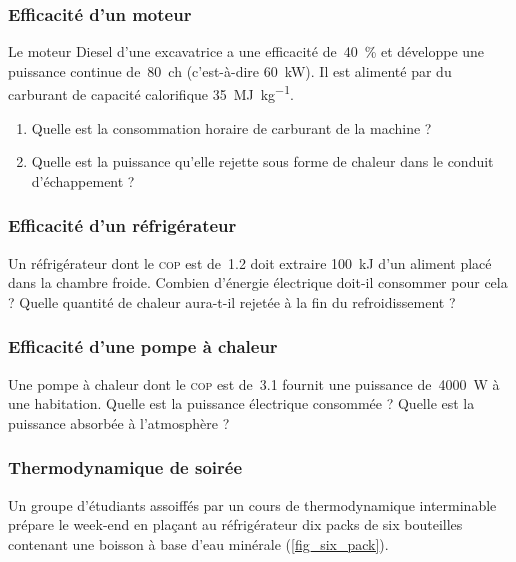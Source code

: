 \begin{boiboiboite}
	\propeau
	\propair
	\isentropiques
\end{boiboiboite}


\subsubsection{Efficacité d’un moteur}
\label{exo_efficacite_moteur}

	Le moteur Diesel d’une excavatrice a une efficacité de~\SI{40}{\percent} et développe une puissance continue de~\SI{80}{ch} (c’est-à-dire \SI{60}{\kilo\watt}). Il est alimenté par du carburant de capacité calorifique \SI{35}{\mega\joule\per\kilogram}.
	
	\begin{enumerate}
		\item Quelle est la consommation horaire de carburant de la machine ?
		\item Quelle est la puissance qu’elle rejette sous forme de chaleur dans le conduit d’échappement ?
	\end{enumerate}

\subsubsection{Efficacité d’un réfrigérateur}
\label{exo_efficacite_refrigerateur}

	Un réfrigérateur dont le \textsc{cop} est de~\num{1,2} doit extraire \SI{100}{\kilo\joule} d’un aliment placé dans la chambre froide. Combien d’énergie électrique doit-il consommer pour cela ? Quelle quantité de chaleur aura-t-il rejetée à la fin du refroidissement ?
	

\subsubsection{Efficacité d’une pompe à chaleur}
\label{exo_efficacite_thermopompe}

	Une pompe à chaleur dont le \textsc{cop} est de~\num{3,1} fournit une puissance de~\SI{4000}{\watt} à une habitation. Quelle est la puissance électrique consommée ? Quelle est la puissance absorbée à l’atmosphère ?


\subsubsection{Thermodynamique de soirée}
\label{exo_bieres}

	Un groupe d’étudiants assoiffés par un cours de thermodynamique interminable prépare le week-end en plaçant au réfrigérateur dix packs de six bouteilles contenant une boisson à base d’eau minérale (\cref{fig_six_pack}).
	
